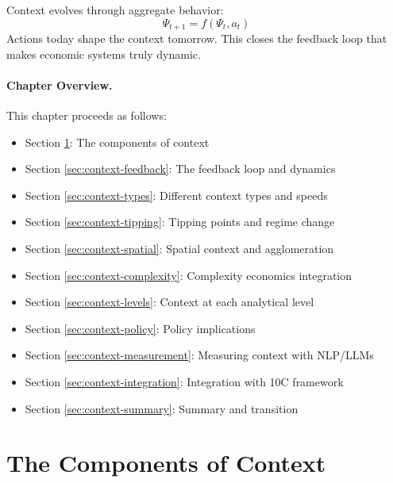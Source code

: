 \begin{definition}
Context evolves through aggregate behavior:
\begin{equation}
\Psi_{t+1} = f(\Psi_t, a_t)
\label{eq:endogenous-context}
\end{equation}
Actions today shape the context tomorrow. This closes the feedback loop
that makes economic systems truly dynamic.
\end{definition}

\paragraph{Chapter Overview.}
This chapter proceeds as follows:
\begin{itemize}
    \item Section \ref{sec:context-components}: The components of context
    \item Section \ref{sec:context-feedback}: The feedback loop and dynamics
    \item Section \ref{sec:context-types}: Different context types and speeds
    \item Section \ref{sec:context-tipping}: Tipping points and regime change
    \item Section \ref{sec:context-spatial}: Spatial context and agglomeration
    \item Section \ref{sec:context-complexity}: Complexity economics integration
    \item Section \ref{sec:context-levels}: Context at each analytical level
    \item Section \ref{sec:context-policy}: Policy implications
    \item Section \ref{sec:context-measurement}: Measuring context with NLP/LLMs
    \item Section \ref{sec:context-integration}: Integration with 10C framework
    \item Section \ref{sec:context-summary}: Summary and transition
\end{itemize}



\section{The Components of Context}
\label{sec:context-components}

